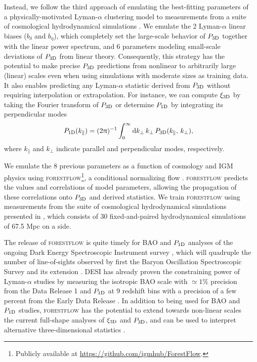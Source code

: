 \documentclass{aa}
\newcommand{\lya}{Lyman-$\alpha$\xspace}
\newcommand{\poned}{\ensuremath{P_{\rm 1D}}\xspace}
\newcommand{\xithreed}{\ensuremath{\xi_{\rm 3D}}\xspace}
\newcommand{\pthreed}{\ensuremath{P_{\rm 3D}}\xspace}
\newcommand{\forestflow}{\textsc{forestflow}\xspace}
\begin{document}
Instead, we follow the third approach of emulating the best-fitting parameters of a physically-motivated \lya clustering model to measurements from a suite of cosmological hydrodynamical simulations \citep[see][]{mcdonald2003MeasurementCosmologicalGeometry, arinyo-i-prats2015NonlinearPowerSpectrum}. We emulate the 2 \lya linear biases ($b_\delta$ and $b_\eta$), which completely set the large-scale behavior of \pthreed together with the linear power spectrum, and 6 parameters modeling small-scale deviations of \pthreed from linear theory. Consequently, this strategy has the potential to make precise \pthreed predictions from nonlinear to arbitrarily large (linear) scales even when using simulations with moderate sizes as training data. It also enables predicting any \lya statistic derived from \pthreed without requiring interpolation or extrapolation. For instance, we can compute \xithreed by taking the Fourier transform of \pthreed or determine \poned by integrating its perpendicular modes
%
\begin{equation}
    \label{eq:p1d}
    \poned(k_\parallel)=(2\uppi)^{-1}\int_0^\infty \mathrm{d} k_\perp\, k_\perp\, \pthreed(k_\parallel,\, k_\perp),
\end{equation}
%
where $k_\parallel$ and $k_\perp$ indicate parallel and perpendicular modes, respectively.

We emulate the 8 previous parameters as a function of cosmology and IGM physics using \forestflow\footnote{Publicly available at \url{https://github.com/igmhub/ForestFlow}.}, a conditional normalizing flow \citep[cNFs;][]{Winkler2019, cNF_Papamakarios}. \forestflow predicts the values and correlations of model parameters, allowing the propagation of these correlations onto \pthreed and derived statistics. We train \forestflow using measurements from the suite of cosmological hydrodynamical simulations presented in \citet{Pedersen2021}, which consists of 30 fixed-and-paired hydrodynamical simulations of 67.5 Mpc on a side.

The release of \forestflow is quite timely for BAO and \poned analyses of the ongoing Dark Energy Spectroscopic Instrument survey \citep[DESI;][]{DESI_collab2016}, which will quadruple the number of line-of-sights observed by first the Baryon Oscillation Spectroscopic Survey \citep[BOSS;][]{boss_dawson2013} and its extension \citep[eBOSS;][]{eboss_dawson2016}. DESI has already proven the constraining power of \lya studies by measuring the isotropic BAO scale with $\simeq1\%$ precision from the Data Release 1 \citep{desicollaboration2024DESI2024IV} and \poned at 9 redshift bins with a precision of a few percent from the Early Data Release \citep{ravoux2023DarkEnergySpectroscopica, karacayli2024Optimal1DLy}. In addition to being used for BAO and \poned studies, \forestflow has the potential to extend towards non-linear scales the current full-shape analyses of \xithreed \citep{cuceu2023ConstraintsCosmicExpansion, 2023MNRAS.518.2567G} and \pthreed \citep{fontribera2018HowEstimate3D, Belsunce2024eBOSS, Horowitz2024}, and can be used to interpret alternative three-dimensional statistics \citep{hui1999GeometricalTestCosmological, fontribera2018HowEstimate3D, Karim2023}.
\end{document}
